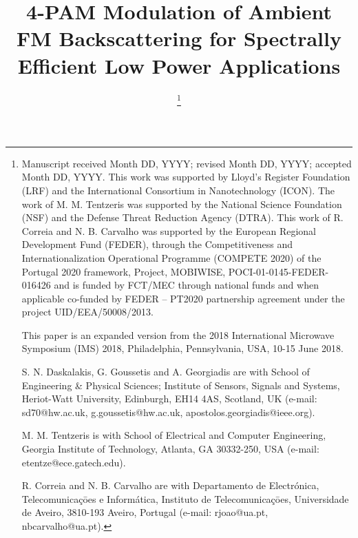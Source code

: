 \documentclass[journal]{IEEEtran}
\begin{document}
\title{4-PAM Modulation of Ambient FM Backscattering for Spectrally Efficient Low Power Applications} 
\author{

\thanks{
Manuscript received Month DD, YYYY; revised Month DD, YYYY; accepted Month DD, YYYY.
This work was supported 
by Lloyd's Register Foundation (LRF) and the International Consortium in Nanotechnology (ICON).
%
The work of M. M. Tentzeris was supported by the National Science Foundation (NSF) and the Defense Threat Reduction Agency (DTRA).
%
This work of  R. Correia and N. B. Carvalho was supported by the European Regional Development Fund (FEDER), through the Competitiveness and Internationalization Operational Programme (COMPETE 2020) of the Portugal 2020 framework, Project, MOBIWISE, POCI-01-0145-FEDER-016426 and is funded by FCT/MEC through national funds and when applicable co-funded by FEDER – PT2020 partnership agreement under the project UID/EEA/50008/2013.

This paper is an expanded version from the 2018 International Microwave Symposium (IMS) 2018, Philadelphia, Pennsylvania, USA, 10-15 June 2018.

S. N. Daskalakis, G. Goussetis and A. Georgiadis  are with School of Engineering \& Physical Sciences;  Institute of Sensors, Signals and Systems, Heriot-Watt University, Edinburgh, EH14 4AS, Scotland,
UK (e-mail: sd70@hw.ac.uk, g.goussetis@hw.ac.uk, apostolos.georgiadis@ieee.org).

M. M. Tentzeris is with School of Electrical and Computer Engineering, Georgia Institute of Technology, Atlanta, GA 30332-250, USA (e-mail: etentze@ece.gatech.edu).

R. Correia and  N. B. Carvalho  are with  
Departamento de Electr\'{o}nica, Telecomunica\c{c}\={o}es e Informática, Instituto de Telecomunica\c{c}\={o}es, Universidade de Aveiro,
3810-193 Aveiro, Portugal (e-mail: rjoao@ua.pt, nbcarvalho@ua.pt).
}}


%
\maketitle
\end{document}
